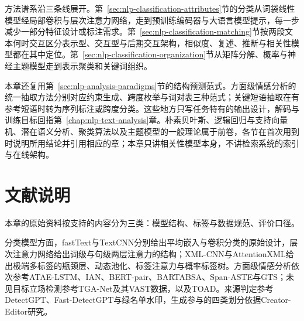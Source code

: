 方法谱系沿三条线展开。第~\ref{sec:nlp-classification-attributes}节的分类从词袋线性模型经局部卷积与层次注意力网络，走到预训练编码器与大语言模型提示，每一步减少一部分特征设计或标注需求。第~\ref{sec:nlp-classification-matching}节按两段文本何时交互区分表示型、交互型与后期交互架构，相似度、复述、推断与相关性模型都在其中定位。第~\ref{sec:nlp-classification-organization}节从矩阵分解、概率与神经主题模型走到表示聚类和关键词组织。

本章还复用第~\ref{sec:nlp-analysis-paradigms}节的结构预测范式。方面级情感分析的统一抽取方法分别对应约束生成、跨度枚举与词对表三种范式；关键短语抽取在有参考短语时转为序列标注或跨度分类。这些地方只写任务特有的输出设计，解码与训练目标回指第~\ref{chap:nlp-text-analysis}章。朴素贝叶斯、逻辑回归与支持向量机、潜在语义分析、聚类算法以及主题模型的一般理论属于前卷，各节在首次用到时说明所用结论并引用相应的章；本章只讲相关性模型本身，不讲检索系统的索引与在线架构。

\FloatBarrier




\section*{文献说明}

本章的原始资料按支持的内容分为三类：模型结构、标签与数据规范、评价口径。

分类模型方面，fastText与TextCNN分别给出平均嵌入与卷积分类的原始设计\cite{nlp-joulin2017fasttext,nlp-kim2014textcnn}，层次注意力网络给出词级与句级两层注意力的结构\cite{nlp-yang2016han}；XML-CNN与AttentionXML给出极端多标签的瓶颈层、动态池化、标签注意力与概率标签树\cite{nlp-liu2017xmlcnn,nlp-you2019attentionxml}。方面级情感分析依次参考ATAE-LSTM、IAN、BERT-pair、BARTABSA、Span-ASTE与GTS\cite{nlp-wang2016atae,nlp-ma2017ian,nlp-sun2019bertpair,nlp-yan2021bartabsa,nlp-xu2021spanaste,nlp-wu2020gts}；未见目标立场检测参考TGA-Net及其VAST数据，以及TOAD\cite{nlp-allaway2020vast,nlp-allaway2021toad}。来源判定参考DetectGPT、Fast-DetectGPT与绿名单水印\cite{nlp-mitchell2023detectgpt,nlp-bao2024fastdetectgpt,nlp-kirchenbauer2023watermark}，生成参与的四类划分依据Creator-Editor研究\cite{nlp-li2026creator}。

